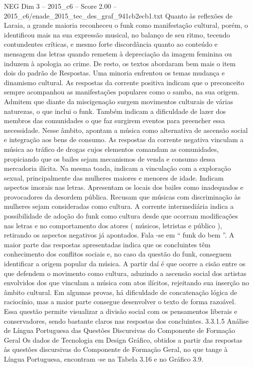 \begin{textsample}{NEG Dim 3 – 2015\_c6 – Score 2.00 – 2015\_c6/enade\_2015\_tec\_des\_graf\_941cb2ecb1.txt}
Quanto às reflexões de Laraia, a grande maioria reconheceu o funk como manifestação cultural, porém, o identificou mais na sua expressão musical, no balanço de seu ritmo, tecendo contundentes críticas, e mesmo forte discordância quanto ao conteúdo e mensagem das letras quando remetem à depreciação da imagem feminina ou induzem à apologia ao crime.
De resto, os textos abordaram bem mais o item dois do padrão de Respostas.
Uma minoria enfrentou os temas mudança e dinamismo cultural.
As respostas da corrente positiva indicam que o preconceito sempre acompanhou as manifestações populares como o samba, na sua origem.
Admitem que diante da miscigenação surgem movimentos culturais de várias naturezas, o que inclui o funk.
Também indicam a dificuldade de lazer dos membros das comunidades o que faz surgirem eventos para preencher essa necessidade.
Nesse âmbito, apontam a música como alternativa de ascensão social e integração aos bens de consumo.
As respostas da corrente negativa vinculam a música ao tráfico de drogas cujos elementos comandam as comunidades, propiciando que os bailes sejam mecanismos de venda e consumo dessa mercadoria ilícita.
Na mesma toada, indicam a vinculação com a exploração sexual, principalmente das mulheres maiores e menores de idade.
Indicam aspectos imorais nas letras.
Apresentam os locais dos bailes como inadequados e provocadores da desordem pública.
Recusam que músicas com discriminação às mulheres sejam consideradas como cultura.
A corrente intermediária indica a possibilidade de adoção do funk como cultura desde que ocorram modificações nas letras e no comportamento dos atores ( músicos, letristas e público ), retirando os aspectos negativos já apontados.
Fala -se em “ funk do bem ”.
A maior parte das respostas apresentadas indica que os concluintes têm conhecimento dos conflitos sociais e, no caso da questão do funk, conseguem identificar a origem popular da música.
A partir daí é que ocorre a cisão entre os que defendem o movimento como cultura, aduzindo a ascensão social dos artistas envolvidos dos que vinculam a música com atos ilícitos, rejeitando sua inserção no âmbito cultural.
Em algumas provas, há dificuldade de concatenação lógica de raciocínio, mas a maior parte consegue desenvolver o texto de forma razoável.
Essa questão permite visualizar a divisão social com os pensamentos liberais e conservadores, sendo bastante claros nas respostas dos concluintes. 3.3.1.5 Análise de Língua Portuguesa das Questões Discursivas do Componente de Formação Geral Os dados de Tecnologia em Design Gráfico, obtidos a partir das respostas às questões discursivas do Componente de Formação Geral, no que tange à Língua Portuguesa, encontram -se na Tabela 3.16 e no Gráfico 3.9.

\end{textsample}
